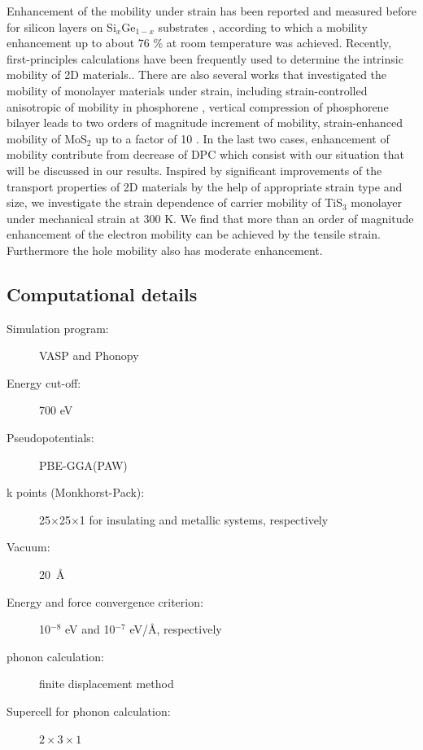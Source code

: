 Enhancement of the mobility under strain has been reported and measured before for silicon layers on Si$_x$Ge$_{1-x}$ substrates \cite{Vogelsang1993,Welser1994}, according to which a mobility enhancement up to about 76 \% at room temperature was achieved. Recently, first-principles calculations have been frequently used to determine the intrinsic mobility of 2D materials.\cite{Kaasbjerg2012,Zhang2014,Yongqing2014}. There are also several works that investigated the mobility of monolayer materials under strain\cite{fei,Henry2015,Sheng2015}, including strain-controlled anisotropic of mobility in phosphorene \cite{fei}, vertical compression of phosphorene bilayer leads to two orders of magnitude increment of mobility\cite{Henry2015}, strain-enhanced mobility of MoS$_2$ up to a factor of 10 \cite{Sheng2015}. In the last two cases, enhancement of mobility contribute from decrease of DPC which consist with our situation that will be discussed in our results. Inspired by significant improvements of the transport properties of 2D materials by the help of appropriate strain type and size, we investigate the strain dependence of  carrier mobility of TiS$_3$ monolayer under mechanical strain at 300 K. We find that more than an order of magnitude enhancement of the electron mobility can be achieved by the tensile strain. Furthermore the hole mobility also has moderate enhancement.


\subsection{Computational details}

\begin{footnotesize}
\begin{description}
\item[Simulation program:] VASP and Phonopy
\item[Energy cut-off:] 700 eV
\item[Pseudopotentials:] PBE-GGA(PAW)
\item[k points (Monkhorst-Pack):] 25$\times$25$\times$1 for insulating and metallic systems, respectively 
\item[Vacuum:] 20~\AA
\item[Energy and force convergence criterion:] 10$^{-8}$ eV and 10$^{-7}$ eV/\AA, respectively
\item[phonon calculation:] finite displacement method
\item[Supercell for phonon calculation:] $2\times3\times1$
\end{description}
\end{footnotesize}


